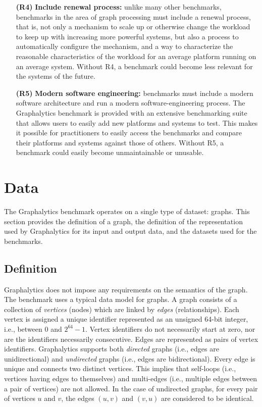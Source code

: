 \begin{itemize}
\item[\textbf{(R4)}] \textbf{Include renewal process:} unlike many other benchmarks, benchmarks in the area of graph processing must include a renewal process, that is, not only a mechanism to scale up or otherwise change the workload to keep up with increasing more powerful systems, but also a process to automatically configure the mechanism, and a way to characterize the reasonable characteristics of the workload for an average platform running on an average system. Without R4, a benchmark could become less relevant for the systems of the future.

\item[\textbf{(R5)}] \textbf{Modern software engineering:} benchmarks must include a modern software architecture and run a modern software-engineering process. The Graphalytics benchmark is provided with an extensive benchmarking suite that allows users to easily add new platforms and systems to test. This makes it possible for practitioners to easily access the benchmarks and compare their platforms and systems against those of others. Without R5, a benchmark could easily become unmaintainable or unusable.
\end{itemize}


\section{Data}
The Graphalytics benchmark operates on a single type of dataset: graphs. This section provides the definition of a graph, the definition of the representation used by Graphalytics for its input and output data, and the datasets used for the benchmarks.

\subsection{Definition}
Graphalytics does not impose any requirements on the semantics of the graph. The benchmark uses a typical data model for graphs. A graph consists of a collection of \emph{vertices} (nodes) which are linked by \emph{edges} (relationships).  Each vertex is assigned a unique identifier represented as an unsigned 64-bit integer, i.e., between $0$ and $2^{64}-1$. Vertex identifiers do not necessarily start at zero, nor are the identifiers necessarily consecutive. Edges are represented as pairs of vertex identifiers. Graphalytics supports both \emph{directed} graphs (i.e., edges are unidirectional) and \emph{undirected} graphs (i.e., edges are bidirectional). Every edge is unique and connects two distinct vertices. This implies that self-loops (i.e., vertices having edges to themselves) and multi-edges (i.e., multiple edges between a pair of vertices) are not allowed. In the case of undirected graphs, for every pair of vertices $u$ and $v$, the edges $(u,v)$ and $(v,u)$ are considered to be identical.

